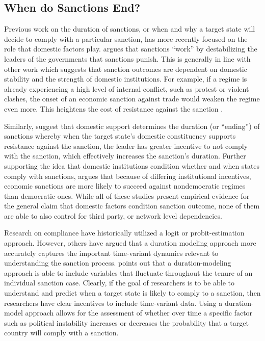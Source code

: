 \subsection*{When do Sanctions End?}
\label{lit}

Previous work on the duration of sanctions, or when and why a target state will decide to comply with a particular sanction, has more recently focused on the role that domestic factors play. \cite{marinov2005} argues that sanctions ``work'' by destabilizing the leaders of the governments that sanctions punish. This is generally in line with other work which suggests that sanction outcomes are dependent on domestic stability and the strength of domestic institutions. For example, if a regime is already experiencing a high level of internal conflict, such as protest or violent clashes, the onset of an economic sanction against trade would weaken the regime even more. This heightens the cost of resistance against the sanction \citep{dashti1997}. 

Similarly, \citep{dorussen2001} suggest that domestic support determines the duration (or ``ending'') of sanctions whereby when the target state's domestic constituency supports resistance against the sanction, the leader has greater incentive to not comply with the sanction, which effectively increases the sanction's duration. Further supporting the idea that domestic institutions condition whether and when states comply with sanctions, \cite{lektzian2007} argues that because of differing institutional incentives, economic sanctions are more likely to succeed against nondemocratic regimes than democratic ones. While all of these studies present empirical evidence for the general claim that domestic factors condition sanction outcome, none of them are able to also control for third party, or network level dependencies. 

Research on compliance have historically utilized a logit or probit-estimation approach. However, others have argued that a duration modeling approach more accurately captures the important time-variant dynamics relevant to understanding the sanction process. \cite{bolks2000} points out that a duration-modeling approach is able to include variables that fluctuate throughout the tenure of an individual sanction case. Clearly, if the goal of researchers is to be able to understand and predict when a target state is likely to comply to a sanction, then researchers have clear incentives to include time-variant data. Using a duration-model approach allows for the assessment of whether over time a specific factor such as political instability increases or decreases the probability that a target country will comply with a sanction.

